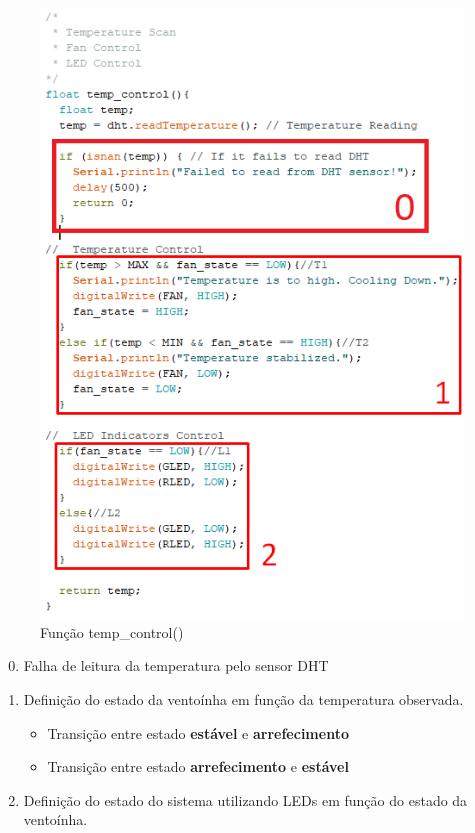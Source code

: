 \begin{figure}[H]
    \centering
    \includegraphics[scale=0.5]{images/codigo/sisB_temp.png}
    \caption{Função temp\_control()}
\end{figure}

\begin{enumerate}
  \setcounter{enumi}{-1}
    \item Falha de leitura da temperatura pelo sensor DHT
    \item Definição do estado da ventoínha em função da temperatura observada.
    \begin{itemize}
        \item Transição entre estado \textbf{estável} e \textbf{arrefecimento}
        \item Transição entre estado \textbf{arrefecimento} e \textbf{estável}
    \end{itemize}
    \item Definição do estado do sistema utilizando LEDs em função do estado da ventoínha.
\end{enumerate}


